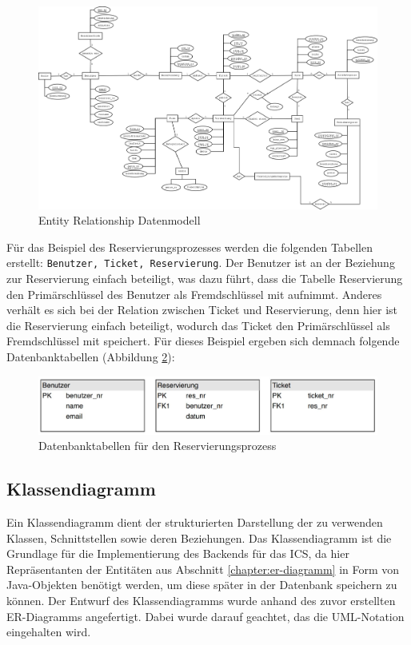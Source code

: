 					\begin{figure}[H]
						\centering 
						\includegraphics[angle=+90,width=13cm]{img/erModell.png}
						\captionsetup{format=hang}
						\caption[ER Datenmodell]{\label{fig:erModell} Entity Relationship Datenmodell}
					\end{figure}
				
		
		Für das Beispiel des Reservierungsprozesses werden die folgenden Tabellen erstellt: \texttt{Benutzer, Ticket, Reservierung}. Der Benutzer ist an der Beziehung zur Reservierung einfach beteiligt, was dazu führt, dass die Tabelle Reservierung den Primärschlüssel des Benutzer als Fremdschlüssel mit aufnimmt. Anderes verhält es sich bei der Relation zwischen Ticket und Reservierung, denn hier ist die Reservierung einfach beteiligt, wodurch das Ticket den Primärschlüssel als Fremdschlüssel mit speichert. Für dieses Beispiel ergeben sich demnach folgende Datenbanktabellen (Abbildung \ref{fig:database_example}):
		 
		\begin{figure}[H]
			\centering 
			\includegraphics[width=15cm]{img/database_example.JPG}
			\captionsetup{format=hang}
			\caption[Datenbanktabellen Reservierungsprozess]{\label{fig:database_example}Datenbanktabellen für den Reservierungsprozess}
		\end{figure}
		
		\subsection{Klassendiagramm}
		Ein Klassendiagramm dient der strukturierten Darstellung der zu verwenden Klassen, Schnittstellen sowie deren Beziehungen. Das Klassendiagramm ist die Grundlage für die Implementierung des Backends für das \ac{ICS}, da hier Repräsentanten der Entitäten aus Abschnitt \ref{chapter:er-diagramm} in Form von Java-Objekten benötigt werden, um diese später in der Datenbank speichern zu können. Der Entwurf des Klassendiagramms wurde anhand des zuvor erstellten ER-Diagramms angefertigt. Dabei wurde darauf geachtet, das die UML-Notation eingehalten wird.
		
